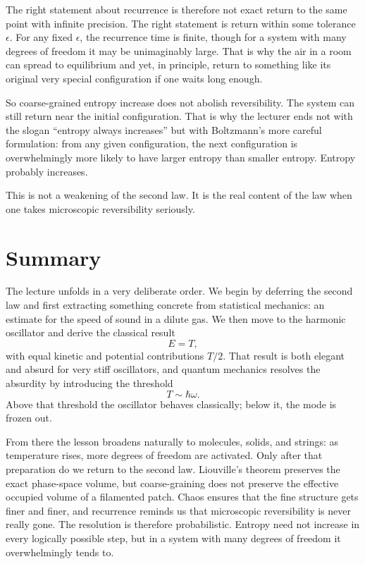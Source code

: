 The right statement about recurrence is therefore not exact return to the same point with infinite precision. The right statement is return within some tolerance \(\epsilon\). For any fixed \(\epsilon\), the recurrence time is finite, though for a system with many degrees of freedom it may be unimaginably large. That is why the air in a room can spread to equilibrium and yet, in principle, return to something like its original very special configuration if one waits long enough.

So coarse-grained entropy increase does not abolish reversibility. The system can still return near the initial configuration. That is why the lecturer ends not with the slogan ``entropy always increases'' but with Boltzmann's more careful formulation: from any given configuration, the next configuration is overwhelmingly more likely to have larger entropy than smaller entropy. Entropy probably increases.

This is not a weakening of the second law. It is the real content of the law when one takes microscopic reversibility seriously.

\section{Summary}

The lecture unfolds in a very deliberate order. We begin by deferring the second law and first extracting something concrete from statistical mechanics: an estimate for the speed of sound in a dilute gas. We then move to the harmonic oscillator and derive the classical result
\begin{equation}
E=T,
\end{equation}
with equal kinetic and potential contributions \(T/2\). That result is both elegant and absurd for very stiff oscillators, and quantum mechanics resolves the absurdity by introducing the threshold
\begin{equation}
T\sim \hbar\omega.
\end{equation}
Above that threshold the oscillator behaves classically; below it, the mode is frozen out.

From there the lesson broadens naturally to molecules, solids, and strings: as temperature rises, more degrees of freedom are activated. Only after that preparation do we return to the second law. Liouville's theorem preserves the exact phase-space volume, but coarse-graining does not preserve the effective occupied volume of a filamented patch. Chaos ensures that the fine structure gets finer and finer, and recurrence reminds us that microscopic reversibility is never really gone. The resolution is therefore probabilistic. Entropy need not increase in every logically possible step, but in a system with many degrees of freedom it overwhelmingly tends to.